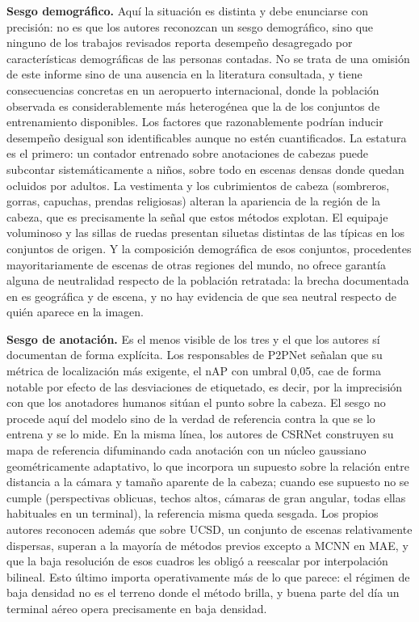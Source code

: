 \textbf{Sesgo demográfico.} Aquí la situación es distinta y debe
enunciarse con precisión: no es que los autores reconozcan un sesgo
demográfico, sino que ninguno de los trabajos revisados reporta
desempeño desagregado por características demográficas de las personas
contadas. No se trata de una omisión de este informe sino de una
ausencia en la literatura consultada, y tiene consecuencias concretas en
un aeropuerto internacional, donde la población observada es
considerablemente más heterogénea que la de los conjuntos de
entrenamiento disponibles. Los factores que razonablemente podrían
inducir desempeño desigual son identificables aunque no estén
cuantificados. La estatura es el primero: un contador entrenado sobre
anotaciones de cabezas puede subcontar sistemáticamente a niños, sobre
todo en escenas densas donde quedan ocluidos por adultos. La vestimenta
y los cubrimientos de cabeza (sombreros, gorras, capuchas, prendas
religiosas) alteran la apariencia de la región de la cabeza, que es
precisamente la señal que estos métodos explotan. El equipaje voluminoso
y las sillas de ruedas presentan siluetas distintas de las típicas en
los conjuntos de origen. Y la composición demográfica de esos conjuntos,
procedentes mayoritariamente de escenas de otras regiones del mundo, no
ofrece garantía alguna de neutralidad respecto de la población
retratada: la brecha documentada en \cite{Lin_2025_CVPR} es geográfica y
de escena, y no hay evidencia de que sea neutral respecto de quién
aparece en la imagen.

\textbf{Sesgo de anotación.} Es el menos visible de los tres y el que
los autores sí documentan de forma explícita. Los responsables de P2PNet
\cite{Song_2021_ICCV} señalan que su métrica de localización más
exigente, el nAP con umbral 0,05, cae de forma notable por efecto de las
desviaciones de etiquetado, es decir, por la imprecisión con que los
anotadores humanos sitúan el punto sobre la cabeza. El sesgo no procede
aquí del modelo sino de la verdad de referencia contra la que se lo
entrena y se lo mide. En la misma línea, los autores de CSRNet
\cite{Li_2018_CVPR} construyen su mapa de referencia difuminando cada
anotación con un núcleo gaussiano geométricamente adaptativo, lo que
incorpora un supuesto sobre la relación entre distancia a la cámara y
tamaño aparente de la cabeza; cuando ese supuesto no se cumple
(perspectivas oblicuas, techos altos, cámaras de gran angular, todas
ellas habituales en un terminal), la referencia misma queda sesgada. Los
propios autores reconocen además que sobre UCSD, un conjunto de escenas
relativamente dispersas, superan a la mayoría de métodos previos excepto
a MCNN en MAE, y que la baja resolución de esos cuadros les obligó a
reescalar por interpolación bilineal. Esto último importa operativamente
más de lo que parece: el régimen de baja densidad no es el terreno donde
el método brilla, y buena parte del día un terminal aéreo opera
precisamente en baja densidad.

